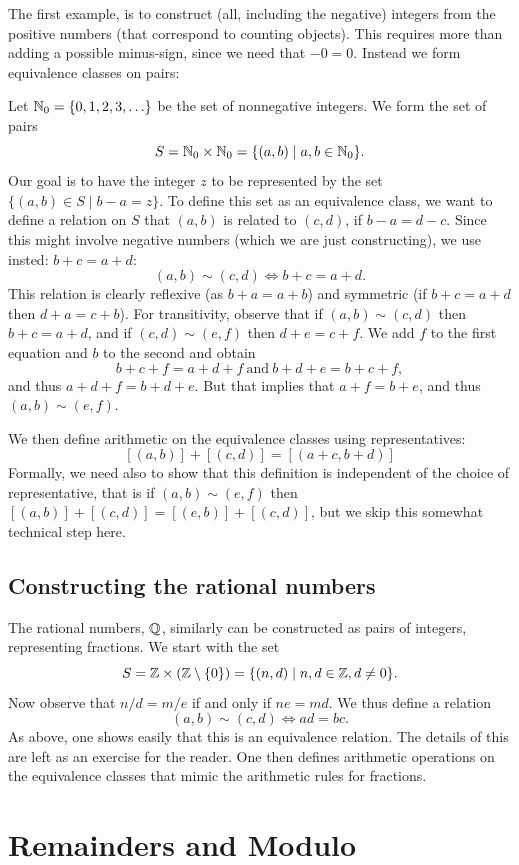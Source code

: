 The first example, is to construct (all, including the negative) integers
from the positive numbers (that correspond to counting objects). This
requires more than adding a possible minus-sign, since we need that $-0=0$.
Instead we form equivalence classes on pairs:

Let ${\mathbb N}_0=\{0,1,2,3,\ldots\}$ be the set of nonnegative integers. We form
the set of pairs
\[
S={\mathbb N}_0\times{\mathbb N}_0=\{(a,b)\mid a,b\in{\mathbb N}_0\}.
\]
Our goal is to have the integer $z$ to be represented by the set
$\{(a,b)\in S\mid b-a=z\}$. To define this set as an equivalence class, we
want to define a relation on $S$ that $(a,b)$ is related to
$(c,d)$, if $b-a=d-c$. Since this might involve negative numbers (which we
are just constructing), we use insted: $b+c=a+d$:
\[
(a,b)\sim(c,d)\Leftrightarrow b+c=a+d.
\]
This relation is clearly reflexive (as $b+a=a+b$) and symmetric (if
$b+c=a+d$ then $d+a=c+b$). For transitivity, observe that if
$(a,b)\sim(c,d)$ then $b+c=a+d$, and if $(c,d)\sim(e,f)$ then $d+e=c+f$. We
add $f$ to the first equation and $b$ to the second and obtain
\[
b+c+f=a+d+f\ \mbox{and}\ b+d+e=b+c+f,
\]
and thus $a+d+f=b+d+e$. But that implies that $a+f=b+e$, and thus
$(a,b)\sim(e,f)$.

We then define arithmetic on the equivalence classes using representatives:
\[
[(a,b)]+[(c,d)]=[(a+c,b+d)]
\]
Formally, we need also to show that this definition is independent of the
choice of representative, that is if $(a,b)\sim(e,f)$ then
$[(a,b)]+[(c,d)]=[(e,b)]+[(c,d)]$, but we skip this somewhat technical step
here.
\bigskip

\subsection{Constructing the rational numbers}

The rational numbers, ${\mathbb Q}$, similarly can be constructed as pairs of
integers,
representing fractions. We start with the set
\[
S={\mathbb Z}\times ({\mathbb Z}\setminus\{0\})=\{(n,d)\mid n,d\in{\mathbb Z},d\not=0\}.
\]
Now observe that $n/d=m/e$ if and only if $ne=md$. We thus define a relation
\[
(a,b)\sim(c,d)\Leftrightarrow ad=bc.
\]
As above, one shows easily that this is an equivalence relation. The details
of this are left as an exercise for the reader. One then
defines arithmetic operations on the equivalence classes that mimic the
arithmetic rules for fractions.

\section{Remainders and Modulo}

